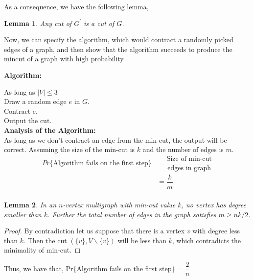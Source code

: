 \documentclass[a4paper,10pt]{article}
\newtheorem{mylm}{Lemma}
\begin{document}
As a consequence, we have the following lemma,\\
\begin{mylm}
 Any cut of $G^{\prime}$ is a cut of $G$.
\end{mylm}
Now, we can specify the algorithm, which would contract a randomly picked edges of a graph, and 
then show that the algorithm succeeds to produce the mincut of a graph with high probability.

\noindent \textbf{Algorithm:}

\indent \hspace{5pt} As long as $|V| \leq 3$\\
\indent \indent \hspace{5pt} Draw a random edge $e$ in $G$.\\
\indent \indent \hspace{5pt} Contract e.\\
\indent \hspace{5pt} Output the cut. \\

\noindent \textbf{Analysis of the Algorithm:}\\
As long as we don't contract an edge from the min-cut, the output will be correct. Assuming the size
of the min-cut is $k$ and the number of edges is $m$.\\
\begin{equation*}
  \begin{array}{ll}
	 Pr\{\mbox{Algorithm fails on the first step}\}& = \dfrac{\mbox{Size of min-cut}}{\mbox{edges in graph}}\\
	 & = \dfrac{k}{m}\\
  \end{array}
\end{equation*}

\begin{mylm}
 In an $n$-vertex multigraph with min-cut value $k$, no vertex has degree smaller than $k$. Further 
the total number of edges in the graph satisfies $m\geq nk/2$.
\end{mylm}
\begin{proof}
 By contradiction let us suppose that there is a vertex $v$ with degree less than $k$. Then the cut 
$(\{v\},V\backslash \{v\})$ will be less than $k$, which contradicts the minimality of min-cut.
\end{proof}

\noindent Thus, we have that, Pr\{Algorithm fails on the first step\} = $\dfrac{2}{n}$
\end{document}
